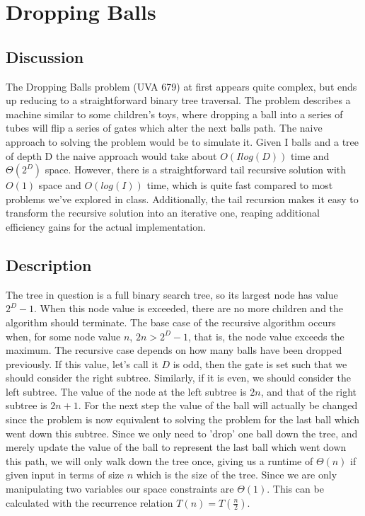 \documentclass[12pt,letterpaper]{article}
\begin{document}
\section{Dropping Balls}
\subsection{Discussion}
The Dropping Balls problem (UVA 679) at first appears quite complex, but ends
up reducing to a straightforward binary tree traversal. The problem describes a
machine similar to some children's toys, where dropping a ball into a series of
tubes will flip a series of gates which alter the next balls path. The naive
approach to solving the problem would be to simulate it. Given I balls and a
tree of depth D the naive approach would take about $O(I log(D))$ time and
$\Theta(2^D)$ space. However, there is a straightforward tail recursive
solution with $O(1)$ space and $O(log(I))$ time, which is quite fast compared
to most problems we've explored in class. Additionally, the tail recursion
makes it easy to transform the recursive solution into an iterative one,
reaping additional efficiency gains for the actual implementation.

\subsection{Description}
The tree in question is a full binary search tree, so its largest node has
value $2^D-1$. When this node value is exceeded, there are no more children and
the algorithm should terminate.
The base case of the recursive algorithm occurs when, for some node value $n$,
$2n > 2^D-1$, that is, the node value exceeds the maximum.
The recursive case depends on how many balls have been dropped previously. If
this value, let's call it $D$ is odd, then the gate is set such that we should
consider the right subtree.
Similarly, if it is even, we should consider the left subtree. The value of the
node at the left subtree is $2n$, and that of the right subtree is $2n+1$. For
the next step the value of the ball will actually be changed since the problem
is now equivalent to solving the problem for the last ball which went down this
subtree. Since we only need to 'drop' one ball down the tree, and merely update
the value of the ball to represent the last ball which went down this path, we
will only walk down the tree once, giving us a runtime of $\Theta(n)$ if given
input in terms of size $n$ which is the size of the tree. Since we are only
manipulating two variables our space constraints are $\Theta(1)$. This can be
calculated with the recurrence
relation $T(n) = T(\frac{n}{2})$.
\end{document}
